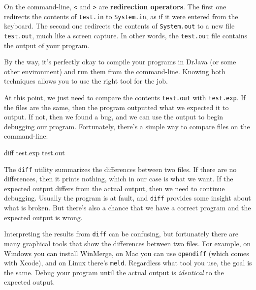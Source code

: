 \documentclass[12pt]{book}
\theoremstyle{exercise}
\newcommand{\java}[1]{\verb"#1"}
\newcommand{\java}[1]{\lstinline{#1}} %
\begin{document}

On the command-line, {\tt <} and {\tt >} are {\bf redirection operators}.
The first one redirects the contents of {\tt test.in} to \java{System.in}, as if it were entered from the keyboard.
The second one redirects the contents of \java{System.out} to a new file {\tt test.out}, much like a screen capture.
In other words, the {\tt test.out} file contains the output of your program.



By the way, it's perfectly okay to compile your programs in DrJava (or some other environment) and run them from the command-line.
Knowing both techniques allows you to use the right tool for the job.

At this point, we just need to compare the contents {\tt test.out} with {\tt test.exp}.
If the files are the same, then the program outputted what we expected it to output.
If not, then we found a bug, and we can use the output to begin debugging our program.
Fortunately, there's a simple way to compare files on the command-line:

\begin{stdout}
diff test.exp test.out
\end{stdout}

The {\tt diff} utility summarizes the differences between two files.
If there are no differences, then it prints nothing, which in our case is what we want.
If the expected output differs from the actual output, then we need to continue debugging.
Usually the program is at fault, and {\tt diff} provides some insight about what is broken.
But there's also a chance that we have a correct program and the expected output is wrong.

Interpreting the results from {\tt diff} can be confusing, but fortunately there are many graphical tools that show the differences between two files. For example, on Windows you can install WinMerge, on Mac you can use {\tt opendiff} (which comes with Xcode), and on Linux there's {\tt meld}. Regardless what tool you use, the goal is the same. Debug your program until the actual output is {\it identical} to the expected output.
\end{document}
